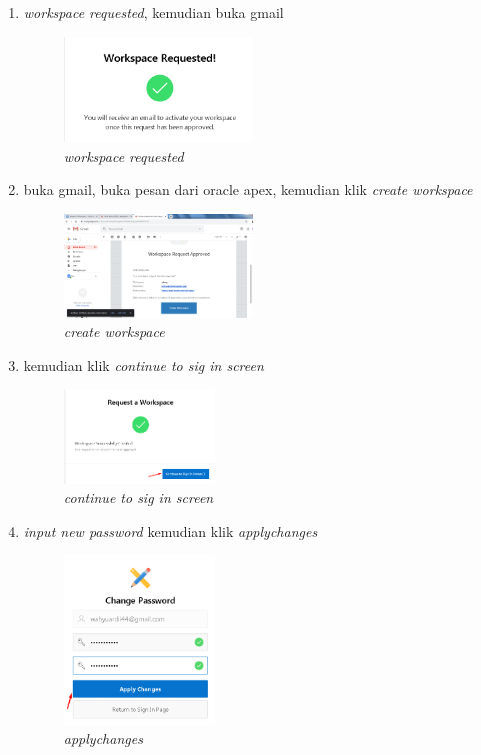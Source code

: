 \documentclass{article}
\begin{document}
\begin{enumerate}
\item \textit{workspace requested}, kemudian buka gmail
    \begin{figure}[ht]
        \centerline{\includegraphics[width=5cm]{h.png}}
        \caption{\textit{workspace requested}}
    \end{figure}
    
\newpage

\item buka gmail, buka pesan dari oracle apex, kemudian klik \textit{create workspace}
     \begin{figure}[ht]
        \centerline{\includegraphics[width=5cm]{i.png}}
        \caption{\textit{create workspace}}
    \end{figure}

\item kemudian klik \textit{continue to sig in screen}
     \begin{figure}[ht]
        \centerline{\includegraphics[width=4cm]{j.png}}
        \caption{\textit{continue to sig in screen}}
    \end{figure}

\item \textit{input new password} kemudian klik \textit{applychanges}
     \begin{figure}[ht]
        \centerline{\includegraphics[width=4cm]{k.png}}
        \caption{\textit{applychanges}}
    \end{figure}
\end{enumerate}
\end{document}
